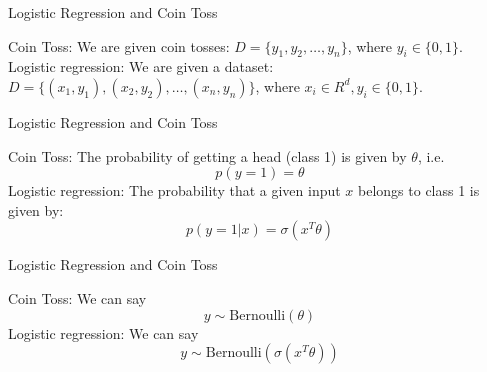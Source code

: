 \documentclass{beamer}
\begin{document}
\begin{frame}{Logistic Regression and Coin Toss}

    Coin Toss: We are given coin tosses: $D = \{y_1, y_2, \ldots, y_n\}$, where $y_i\in \{0,1\}$. \\
    \vspace{10pt}
    \pause  Logistic regression: We are given a dataset: $D = \{(x_1, y_1), (x_2,y_2), \ldots, (x_n, y_n)\}$, where $x_i\in R^d, y_i\in \{0,1\}$. \\

    

    

    
\end{frame}

\begin{frame}{Logistic Regression and Coin Toss}

    Coin Toss: The probability of getting a head (class 1) is given by $\theta$, i.e.
    $$p(y=1) = \theta$$
    \vspace{10pt}
    \pause 
    Logistic regression: The probability that a given input $x$ belongs to class 1 is given by:
    $$p(y=1|x) = \sigma(x^T\theta)$$
\end{frame}

\begin{frame}{Logistic Regression and Coin Toss}

    Coin Toss: We can say 
    $$y \sim \text{Bernoulli}(\theta)$$
    \vspace{10pt}
    \pause 
    Logistic regression: We can say
    $$y \sim \text{Bernoulli}(\sigma(x^T\theta))$$
\end{frame}\


                
                
        
        
        
        
        
    
\end{document}
